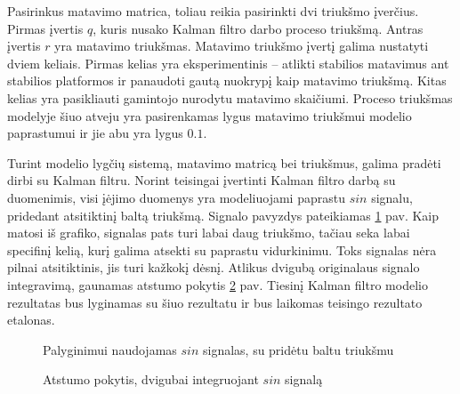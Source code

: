Pasirinkus matavimo matrica, toliau reikia pasirinkti dvi triukšmo įverčius.
Pirmas įvertis $q$, kuris nusako Kalman filtro darbo proceso triukšmą.
Antras įvertis $r$ yra matavimo triukšmas. 
Matavimo triukšmo įvertį galima nustatyti dviem keliais. 
Pirmas kelias yra eksperimentinis -- atlikti stabilios matavimus ant stabilios platformos ir panaudoti gautą nuokrypį kaip matavimo triukšmą.
Kitas kelias yra pasikliauti gamintojo nurodytu matavimo skaičiumi.
Proceso triukšmas modelyje šiuo atveju yra pasirenkamas lygus matavimo triukšmui modelio paprastumui ir jie abu yra lygus $0.1$.

Turint modelio lygčių sistemą, matavimo matricą bei triukšmus, galima pradėti dirbi su Kalman filtru.
Norint teisingai įvertinti Kalman filtro darbą su duomenimis, visi įėjimo duomenys yra modeliuojami paprastu $sin$ signalu, pridedant atsitiktinį baltą triukšmą.
Signalo pavyzdys pateikiamas \ref{fig:sin_acc_data_with_noise} pav.
Kaip matosi iš grafiko, signalas pats turi labai daug triukšmo, tačiau seka labai specifinį kelią, kurį galima atsekti su paprastu vidurkinimu.
Toks signalas nėra pilnai atsitiktinis, jis turi kažkokį dėsnį.
Atlikus dvigubą originalaus signalo integravimą, gaunamas atstumo pokytis \ref{fig:sin_distance_data_with_noise} pav.
Tiesinį Kalman filtro modelio rezultatas bus lyginamas su šiuo rezultatu ir bus laikomas teisingo rezultato etalonas.

\begin{figure}
    \centering
    \caption{Palyginimui naudojamas $sin$ signalas, su pridėtu baltu triukšmu}
    \label{fig:sin_acc_data_with_noise}
\end{figure}

\begin{figure}
    \centering
    \caption{Atstumo pokytis, dvigubai integruojant $sin$ signalą}
    \label{fig:sin_distance_data_with_noise}
\end{figure}

